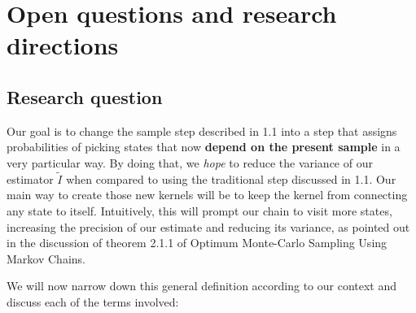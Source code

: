 

\section{Open questions and research directions}

\subsection{Research question}

Our goal is to change the sample step described in 1.1 into a step that assigns probabilities of picking states that now \textbf{depend on the present sample} in a very particular way. By doing that, we \textit{hope} to reduce the variance of our estimator $\tilde{I}$ when compared to using the traditional step discussed in 1.1. Our main way to create those new kernels will be to keep the kernel from connecting any state to itself. Intuitively, this will prompt our chain to visit more states, increasing the precision of our estimate and reducing its variance, as pointed out in the discussion of theorem 2.1.1 of Optimum Monte-Carlo Sampling Using Markov Chains.



We will now narrow down this general definition according to our context and discuss each of the terms involved:

